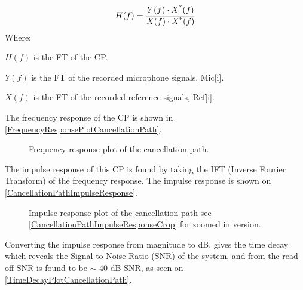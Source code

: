 \begin{equation}\label{FrequencyResponseCPEq2}
H(f) = \frac{Y(f) \cdot X\textsuperscript{*}(f)}{X(f) \cdot X\textsuperscript{*}(f)}
\end{equation}
Where:
\begin{description}
	\item $H(f)$ is the FT of the CP.
	\item $Y(f)$ is the FT of the recorded microphone signals, Mic[i].
	\item $X(f)$ is the FT of the recorded reference signals, Ref[i].
\end{description}

The frequency response of the CP is shown in \autoref{FrequencyResponsePlotCancellationPath}.

\begin{figure}[H]
	\centering
	
	\caption{Frequency response plot of the cancellation path.}
	\label{FrequencyResponsePlotCancellationPath}
\end{figure}

The impulse response of this CP is found by taking the IFT (Inverse Fourier Transform) of the frequency response.
The impulse response is shown on \autoref{CancellationPathImpulseResponse}.

\begin{figure}[H]
	\centering
	
	\caption{Impulse response plot of the cancellation path see \autoref{CancellationPathImpulseResponseCrop} for zoomed in version.}
	\label{CancellationPathImpulseResponse}
\end{figure}



Converting the impulse response from magnitude to dB, gives the time decay which reveals the Signal to Noise Ratio (SNR) of the system, and from the read off SNR is found to be $\sim$ 40 dB SNR, as seen on \autoref{TimeDecayPlotCancellationPath}.

